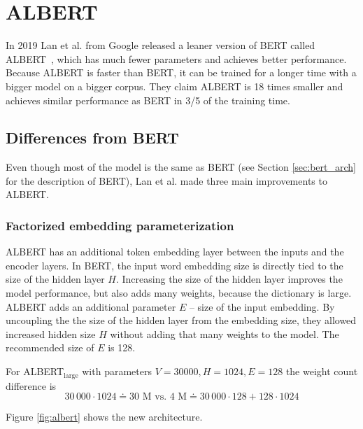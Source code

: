 \documentclass[
  printed, %
  color,   %
  table,   %
  oneside, %
  lof,     %
  lot,     %
]{fithesis3}
\begin{document}
\section{ALBERT}
In 2019 Lan et al. from Google released a leaner version of BERT called ALBERT~\parencite{albert}, which has much fewer parameters and achieves better performance. Because ALBERT is faster than BERT, it can be trained for a longer time with a bigger model on a bigger corpus. They claim ALBERT is 18 times smaller and achieves similar performance as BERT in 3/5 of the training time.

\subsection{Differences from BERT}
\label{sec:albert_pretraining}
Even though most of the model is the same as BERT (see Section \ref{sec:bert_arch} for the description of BERT), Lan et al. made three main improvements to ALBERT.

\subsubsection{Factorized embedding parameterization}
ALBERT has an additional token embedding layer between the inputs and the encoder layers. In BERT, the input word embedding size is directly tied to the size of the hidden layer $H$. Increasing the size of the hidden layer improves the model performance, but also adds many weights, because the dictionary is large. ALBERT adds an additional parameter $E$ -- size of the input embedding. By uncoupling  the the size of the hidden layer from the embedding size, they allowed increased hidden size $H$ without adding that many weights to the model. The recommended size of $E$ is 128.

\noindent\vbox{\parindent=0pt
 \setlength\abovedisplayskip{0pt}
 \setlength\abovedisplayshortskip{0pt}
 \setlength\belowdisplayskip{0pt}
 \setlength\belowdisplayshortskip{0pt}
For ALBERT$_\text{large}$ with parameters $V = 30000, H=1024, E=128$ the weight count difference is
\begin{equation*}
     30\,000 \cdot 1024 \doteq 30 \text{ M vs. } 4 \text{ M} \doteq 30\,000 \cdot 128 + 128 \cdot 1024
\end{equation*}
}

\vspace{4pt}
{\parindent=0cm
Figure \ref{fig:albert} shows the new architecture.
}
\end{document}
